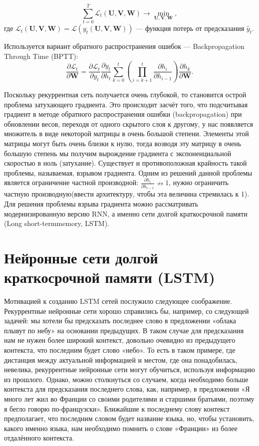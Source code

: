 \documentclass{article}
\begin{document}
\begin{equation*}
\sum_{t=0}^{T} \mathcal{L}_t (\mathbf{U}, \mathbf{V}, \mathbf{W}) \rightarrow \min_{\mathbf{U},\mathbf{ V}, \mathbf{W}},
\end{equation*}
где $\mathcal{L}_t (\mathbf{U}, \mathbf{V}, \mathbf{W}) = \mathcal{L} (y_t(\mathbf{U}, \mathbf{V}, \mathbf{W}))$ --- функция потерь от предсказания $\hat{y}_t$.

Используется вариант обратного распространения ошибок --- Backpropagation Through Time (BPTT):
\begin{equation*}
\dfrac{\partial \mathcal{L}_t}{\partial \mathbf{W}} = \dfrac{\partial \mathcal{L}_t}{\partial y_t} \dfrac{\partial y_t}{\partial h_t} \sum_{k=0}^t \left( \prod_{i = k + 1}^t \dfrac{\partial h_i}{\partial h_{i-1}} \right) \dfrac{\partial h_k}{\partial \mathbf{W}}.
\end{equation*}

Поскольку рекуррентная сеть получается очень глубокой, то становится острой
проблема затухающего градиента. Это происходит засчёт того, что подсчитывая градиент в методе обратного распространения ошибки (backpropagation) при обновлении
весов, переходя от одного скрытого слоя к другому, у нас появляется множитель в виде некоторой матрицы в очень большой степени. Элементы этой матрицы могут быть очень близки к нулю, тогда возводя эту матрицу в очень большую степень мы получим
вырождение градиента с экспоненциальной скоростью в ноль (затухание). Существует и
противоположная крайность такой проблемы, называемая, взрывом градиента. Одним
из решений данной проблемы является ограничение частной производной: $\frac{\partial h_i}{\partial h_{i-1}}\nrightarrow 1$, нужно ограничить частную производную(ввести архитектуру, чтобы эта величина стремилась к 1).
Для решения проблемы взрыва градиента можно рассматривать модернизированную версию RNN, а именно сети долгой краткосрочной памяти (Long short-termmemory, LSTM).

\section{Нейронные сети долгой краткосрочной памяти (LSTM)}
Мотивацией к созданию LSTM сетей послужило следующее соображение. Рекуррентные нейронные сети хорошо справились бы, например, со следующей задачей: мы
хотели бы предсказать последнее слово в предложении «облака плывут по небу» на
основании предыдущих. В таком случае для предсказания нам не нужен более широкий контекст, довольно очевидно из предыдущего контекста, что последним будет слово
«небо». То есть в таком примере, где дистанция между актуальной информацией и местом, где она понадобилась, невелика, рекуррентные нейронные сети могут обучиться,
используя информацию из прошлого. Однако, можно столкнуться со случаем, когда
необходимо больше контекста для предсказания последнего слова, как, например, в
предложении «Я много лет жил во Франции со своими родителями и старшими братьями, поэтому я бегло говорю по-французски». Ближайшие к последнему слову контекст
предполагает, что последним словом будет название языка, но, чтобы установить, какого именно языка, нам необходимо помнить о слове «Франции» из более отдалённого
контекста.
\end{document}
